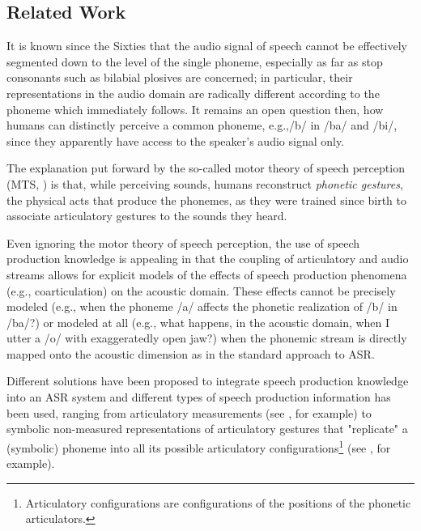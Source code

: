 \subsection{Related Work}

It is known since the Sixties \cite{liberman1} that the audio signal of speech
cannot be effectively segmented down to the level of the single phoneme,
especially as far as stop consonants such as bilabial plosives
are concerned; in particular, their representations in the audio domain are
radically different according to the phoneme which immediately follows.
It remains an open question then, how humans can
distinctly perceive a common phoneme, e.g.,/b/ in  /ba/ and /bi/, since they
apparently have access to the speaker's audio signal only.

The explanation put forward by the so-called motor theory of speech perception
(MTS, \cite{liberman2,galant}) is that, while perceiving sounds,
humans reconstruct \emph{phonetic gestures}, the physical acts that 
produce the phonemes, as they were trained since birth to associate
articulatory gestures to the sounds they heard. 

Even ignoring the motor theory of speech perception, the use of speech production knowledge is appealing in that the coupling of articulatory and audio streams allows for explicit models of the effects of speech production phenomena (e.g., coarticulation) on the acoustic domain. These effects cannot be precisely modeled (e.g., when the phoneme /a/ affects the phonetic realization of /b/ in /ba/?)  or modeled at all (e.g., what happens, in the acoustic domain, when I utter a /o/ with exaggeratedly open jaw?) when the phonemic stream is directly mapped onto the acoustic dimension as in the standard approach to ASR.  

Different solutions have been proposed to integrate speech production knowledge into an ASR system and different types of speech production information has been used, ranging from articulatory measurements (see \cite{zlokarnik,stephenson,wrench}, for example) to symbolic non-measured representations of articulatory gestures that "replicate" a (symbolic) phoneme into all its possible articulatory configurations\footnote{Articulatory configurations are configurations of the positions of the phonetic articulators.} (see \cite{richardson, livescu}, for example).
 
   

